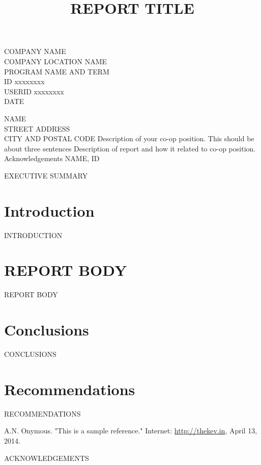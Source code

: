 \documentclass[12pt]{article}
\begin{document}
\title{REPORT TITLE}
{
	COMPANY NAME\\
	COMPANY LOCATION
}
{
	NAME\\
	PROGRAM NAME AND TERM\\
	ID xxxxxxxx\\
	USERID xxxxxxxx\\
	DATE
}


{
	\noindent
	NAME\\
	STREET ADDRESS\\
	CITY AND POSTAL CODE
}
{
	Description of your co-op position. This should be about three sentences
}
{
	Description of report and how it related to co-op position.
}
{
	Acknowledgements
}
{
	NAME, ID
}


EXECUTIVE SUMMARY
\newpage


\toc


\section{Introduction}
INTRODUCTION


\section{REPORT BODY}
REPORT BODY


\section{Conclusions}
CONCLUSIONS


\section{Recommendations}
RECOMMENDATIONS


\newpage
{}
\begin{thebibliography}{9}
		A.N. Onymous. "This is a sample reference." Internet: \url{http://thekev.in}, April 13, 2014.
\end{thebibliography}
\newpage


ACKNOWLEDGEMENTS
\newpage


\end{document}
